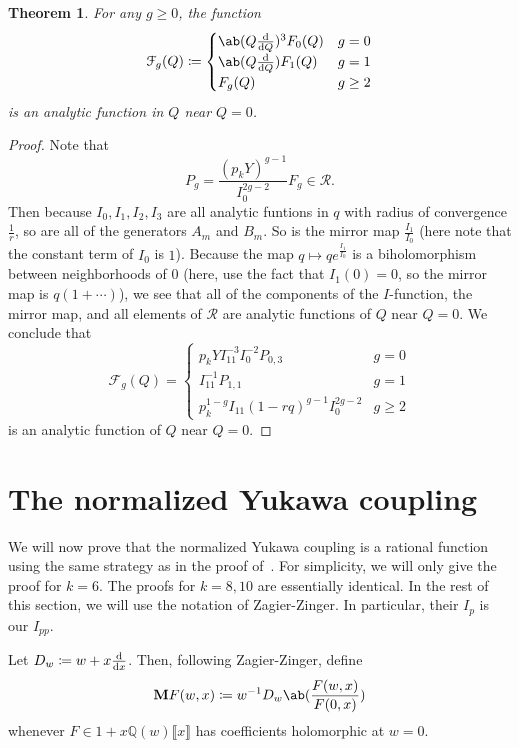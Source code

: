 \documentclass[10pt]{amsart}
\newtheorem{thm}{Theorem}[section]
\theoremstyle{definition}
\theoremstyle{remark}
\theoremstyle{plain}
\theoremstyle{definition}
\theoremstyle{remark}
\newcommand{\Q}{\mathbb{Q}}
\newcommand{\mc}[1]{\mathcal{#1}}
\newcommand{\msc}[1]{\mathscr{#1}}
\newcommand{\mbf}[1]{\mathbf{#1}}
\newcommand{\1}{\mathbf{1}}
\newcommand{\2}{\mathbf{2}}
\newcommand{\3}{\mathbf{3}}
\numberwithin{equation}{section}
\begin{document}
\begin{thm}\label{thm:analytic}
    For any $g \geq 0$, the function 
    \[ \mc{F}_g(Q) \coloneqq \begin{cases}
        \ab(Q \odv{}{Q})^3 F_0(Q) & g=0 \\
        \ab(Q \odv{}{Q}) F_1(Q) & g=1 \\
        F_g(Q) & g\geq 2 
    \end{cases}
    \]
    is an analytic function in $Q$ near $Q = 0$. 
\end{thm}

\begin{proof}
    Note that
    \[ P_g = \frac{(p_k Y)^{g-1}}{I_0^{2g-2}} F_g \in \msc{R}. \]
    Then because $I_0, I_1, I_2, I_3$ are all analytic funtions in $q$ with radius of convergence $\frac{1}{r}$, so are all of the generators $A_m$ and $B_m$. So is the mirror map $\frac{I_1}{I_0}$ (here note that the constant term of $I_0$ is $1$). Because the map $q \mapsto qe^{\frac{I_1}{I_0}}$ is a biholomorphism between neighborhoods of $0$ (here, use the fact that $I_1(0) = 0$, so the mirror map is $q(1+\cdots)$), we see that all of the components of the $I$-function, the mirror map, and all elements of $\msc{R}$ are analytic functions of $Q$ near $Q=0$. We conclude that
    \[ \mc{F}_g(Q) = \begin{cases}
        p_k Y I_{11}^{-3} I_0^{-2} P_{0,3} & g=0 \\
        I_{11}^{-1} P_{1,1} & g=1 \\
        p_k^{1-g}I_{11}(1-rq)^{g-1}I_0^{2g-2} & g \geq 2
    \end{cases}
    \]
    is an analytic function of $Q$ near $Q = 0$.
\end{proof}




\appendix

\section{The normalized Yukawa coupling}
\label{sec:yukawa coupling}


We will now prove that the normalized Yukawa coupling is a rational function using the same strategy as in the proof of~\cite[Theorem 2]{zagierzinger}. For simplicity, we will only give the proof for $k=6$. The proofs for $k=8, 10$ are essentially identical. In the rest of this section, we will use the notation of Zagier-Zinger. In particular, their $I_p$ is our $I_{pp}$.

Let $D_w \coloneqq w + x \odv{}{x}$. Then, following Zagier-Zinger, define
\[ \mbf{M}F(w,x) \coloneqq w^{-1} D_w\ab(\frac{F(w,x)}{F(0,x)}) \]
whenever $F \in 1+x\Q(w)\llbracket x \rrbracket$ has coefficients holomorphic at $w=0$.
\end{document}
